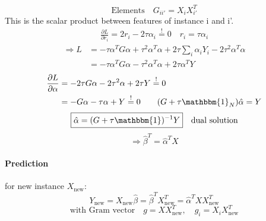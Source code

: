 \documentclass[11pt]{article}
\begin{document}
    \begin{equation*}
      \text{Elements} \quad G_{ii'}=X_iX_{i'}^T
    \end{equation*}
    This is the scalar product between features of instance i and i'.
    \begin{equation*}
      \begin{align*}
        \frac{\partial L}{\partial r_i}=2r_i-2\tau\alpha_i \overset{!}{=}0
        \quad r_i = \tau \alpha_i
      \end{align*}
    \end{equation*}
    \begin{equation*}
      \begin{align*}
        \Rightarrow L&= -\tau \alpha^T G \alpha+\tau^2\alpha^T\alpha+2\tau\sum_i\alpha_i
        Y_i-2\tau^2\alpha^T\alpha \\
        &= -\tau \alpha^T G \alpha - \tau^2 \alpha^T\alpha+2\tau\alpha^TY
      \end{align*}
    \end{equation*}
    \begin{equation*}
      \begin{align*}
        \frac{\partial L}{\partial \alpha}&=-2\tau G\alpha-2\tau^2\alpha+2\tau Y
        \overset{!}{=}0 \\
        &= -G\alpha-\tau \alpha+Y \overset{!}{=}0 \quad \quad (G+\tau\mathbbm{1}_N)\hat{\alpha}=Y
      \end{align*}
    \end{equation*}
    \begin{equation*}
      \boxed{\hat{\alpha}=(G+\tau \mathbbm{1})^{-1}Y} \quad \text{dual solution}
    \end{equation*}
    \begin{equation*}
      \Rightarrow \hat{\beta}^T=\hat{\alpha}^TX
    \end{equation*}
    \noindent \paragraph{Prediction} for new instance $X_{\text{new}}$:
    \begin{equation*}
      Y_{\text{new}}=X_{\text{new}}\hat{\beta}=\hat{\beta}^TX_{\text{new}}^T
      =\hat{\alpha}^TXX_{\text{new}}^T
    \end{equation*}
    \begin{equation*}
      \text{with Gram vector} \quad g=XX_{\text{new}}^T, \quad g_i=X_iX_{\text{new}}^T
    \end{equation*}
\end{document}
